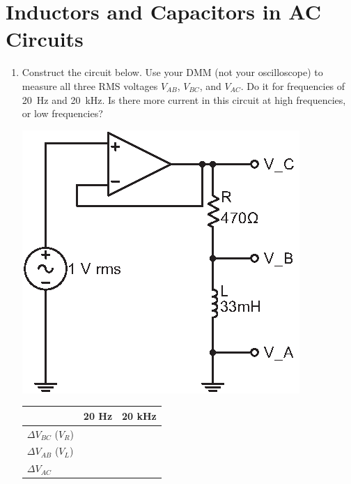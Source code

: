 \section{Inductors and Capacitors in AC Circuits }
\label{lab_ac_circuits}


\bigskip

\begin{enumerate}[wide]

\item Construct the circuit below.  Use your DMM (not your oscilloscope) to measure all three RMS voltages $V_{AB}$,  $V_{BC}$, and $V_{AC}$.  Do it for frequencies of 20~Hz and 20~kHz.  Is there more current in this circuit at high frequencies, or low frequencies? 

\begin{minipage}{.55\textwidth}
\begin{center}
\includegraphics{ac_circuits/RandL.eps}
\end{center}
\end{minipage}
\begin{minipage}{.4\textwidth}
\begin{center} 
\begin{tabular}{|l|c|c|} 
\hline & 20 Hz & 20 kHz \\ 
\hline $\Delta V_{BC}$ ($V_R$) & & \\ 
\hline $\Delta V_{AB}$ ($V_L$) & & \\ 
\hline $\Delta V_{AC}$ & & \\ 
\hline 
\end{tabular} 
\end{center}
\end{minipage}



\end{enumerate}
